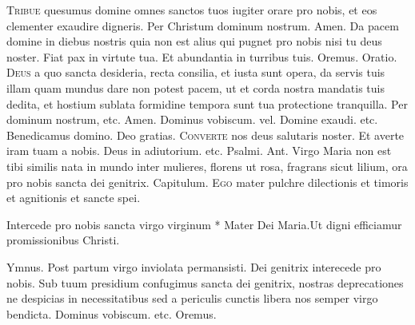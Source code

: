 \begin{multicols*}{2}
\lettrine[lines=2]{\zallmancaps \color{Red} T}{ribue} quesumus domine omnes sanctos tuos iugiter orare pro nobis, et eos clementer exaudire digneris. Per Christum dominum nostrum. Amen.
 Da pacem domine in diebus nostris quia non est alius qui pugnet pro nobis nisi tu deus noster. \V Fiat pax in virtute tua. \R Et abundantia in turribus tuis. Oremus. {\color{Red} Oratio.}
\lettrine[lines=2]{\zallmancaps \color{Blue} D}{eus} a quo sancta desideria, recta consilia, et iusta sunt opera, da servis tuis illam quam mundus dare non potest pacem, ut et corda nostra mandatis tuis dedita, et hostium sublata formidine tempora sunt tua protectione tranquilla. Per dominum nostrum, etc. Amen. Dominus vobiscum. {\color{Red} vel.} Domine exaudi. etc. Benedicamus domino. Deo gratias.
{\color{Red} }
\lettrine[lines=2]{\zallmancaps \color{Red} C}{onverte} nos deus salutaris noster. Et averte iram tuam a nobis. Deus in adiutorium. etc. {\color{Red} Psalmi.}
{\color{Red} Ant.} Virgo Maria non est tibi similis nata in mundo inter mulieres, florens ut rosa, fragrans sicut lilium, ora pro nobis sancta dei genitrix. {\color{Red} Capitulum.}
\lettrine[lines=2]{\zallmancaps \color{Blue} E}{go} mater pulchre dilectionis et timoris et agnitionis et sancte spei.
\begin{responsory-breve}
{Intercede pro nobis sancta virgo virginum * Mater Dei Maria.}{Ut digni efficiamur promissionibus Christi.}
\end{responsory-breve}
{\color{Red} Ymnus.}
\newline \V Post partum virgo inviolata permansisti.
\newline \R Dei genitrix interecede pro nobis.
 Sub tuum presidium confugimus sancta dei genitrix, nostras deprecationes ne despicias in necessitatibus sed a periculis cunctis libera nos semper virgo bendicta. Dominus vobiscum. etc. Oremus.

\end{multicols*}
